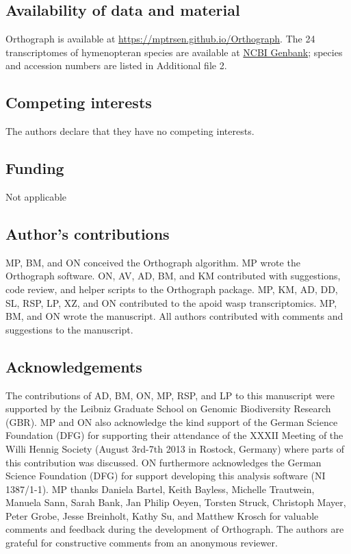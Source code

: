 \subsection{Availability of data and material}

Orthograph is available at \url{https://mptrsen.github.io/Orthograph}. The 24 transcriptomes of hymenopteran species are available at \href{http://www.ncbi.nlm.nih.gov/bioproject/?term=PRJNA183205}{NCBI Genbank}; species and accession numbers are listed in Additional file 2.

\subsection{Competing interests}

The authors declare that they have no competing interests.

\subsection{Funding}

Not applicable

\subsection{Author's contributions}

MP, BM, and ON conceived the Orthograph algorithm. MP wrote the Orthograph
software. ON, AV, AD, BM, and KM contributed with suggestions, code review, and
helper scripts to the Orthograph package. MP, KM, AD, DD, SL, RSP, LP, XZ, and
ON contributed to the apoid wasp transcriptomics. MP, BM, and ON wrote the
manuscript. All authors contributed with comments and suggestions to the
manuscript.

\subsection{Acknowledgements}

The contributions of AD, BM, ON, MP, RSP, and LP to this manuscript were
supported by the Leibniz Graduate School on Genomic Biodiversity Research
(GBR).  MP and ON also acknowledge the kind support of the German Science
Foundation (DFG) for supporting their attendance of the XXXII Meeting of the
Willi Hennig Society (August 3rd-7th 2013 in Rostock, Germany) where parts of
this contribution was discussed.  ON furthermore acknowledges the German
Science Foundation (DFG) for support developing this analysis software (NI
1387/1-1).  MP thanks Daniela Bartel, Keith Bayless, Michelle Trautwein,
Manuela Sann, Sarah Bank, Jan Philip Oeyen, Torsten Struck, Christoph Mayer,
Peter Grobe, Jesse Breinholt, Kathy Su, and Matthew Krosch for valuable
comments and feedback during the development of Orthograph.  The authors are
grateful for constructive comments from an anonymous reviewer.

